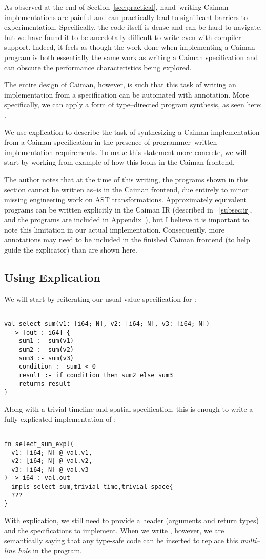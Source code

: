 As observed at the end of Section~\ref{sec:practical}, hand--writing Caiman implementations are painful and can practically lead to significant barriers to experimentation.  Specifically, the code itself is dense and can be hard to navigate, but we have found it to be anecdotally difficult to write even with compiler support.  Indeed, it feels as though the work done when implementing a Caiman program is both essentially the same work as writing a Caiman specification and can obscure the performance characteristics being explored.

The entire design of Caiman, however, is such that this task of writing an implementation from a specification can be automated with annotation.  More specifically, we can apply a form of type--directed program synthesis, as seen here: .

We use explication to describe the task of synthesizing a Caiman implementation from a Caiman specification in the presence of programmer--written implementation requirements.  To make this statement more concrete, we will start by working from example of how this looks in the Caiman frontend.

The author notes that at the time of this writing, the programs shown in this section cannot be written as--is in the Caiman frontend, due entirely to minor missing engineering work on AST transformations.  Approximately equivalent programs can be written explicitly in the Caiman IR (described in ~\ref{subsec:ir}, and the programs are included in Appendix~), but I believe it is important to note this limitation in our actual implementation.  Consequently, more annotations may need to be included in the finished Caiman frontend (to help guide the explicator) than are shown here.

\subsection{Using Explication}

We will start by reiterating our usual value specification for :
%
\begin{lstlisting}

val select_sum(v1: [i64; N], v2: [i64; N], v3: [i64; N]) 
  -> [out : i64] {
    sum1 :- sum(v1)
    sum2 :- sum(v2)
    sum3 :- sum(v3)
    condition :- sum1 < 0
    result :- if condition then sum2 else sum3
    returns result
}
\end{lstlisting}
%
Along with a trivial timeline and spatial specification, this is enough to write a fully explicated implementation of :
%
\begin{lstlisting}

fn select_sum_expl(
  v1: [i64; N] @ val.v1,
  v2: [i64; N] @ val.v2,
  v3: [i64; N] @ val.v3
) -> i64 : val.out 
  impls select_sum,trivial_time,trivial_space{
  ???
}
\end{lstlisting}
%
With explication, we still need to provide a header (arguments and return types) and the specifications to implement.  When we write , however, we are semantically saying that any type-safe code can be inserted to replace this \emph{multi--line hole} in the program.

